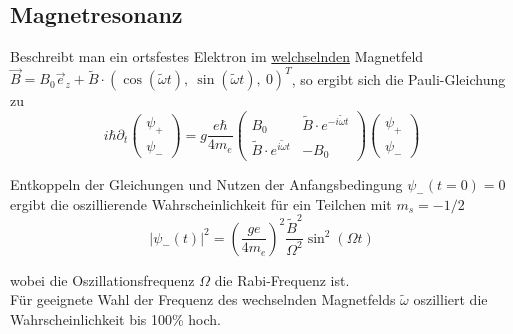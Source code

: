 \documentclass{article}
\newcommand{\lr}[1]{\left(#1\right)}
\begin{document}
\subsection{Magnetresonanz}
Beschreibt man ein ortsfestes Elektron im \underline{welchselnden} Magnetfeld $\vec{B} = B_0\vec{e}_z + \tilde{B}\cdot (\cos(\tilde{\omega}t),\ \sin(\tilde{\omega}t) ,\ 0 )^T$, so ergibt sich die Pauli-Gleichung zu
	\begin{equation}
		i\hbar\partial_t \begin{pmatrix} \psi_+ \\ \psi_- \end{pmatrix} = g \frac{e\hbar}{4m_e} 
		\begin{pmatrix}
			B_0 & \tilde{B} \cdot e^{-i\tilde{\omega}t} \\
			\tilde{B} \cdot e^{i\tilde{\omega}t} & -B_0
		\end{pmatrix} 
		\begin{pmatrix} \psi_+ \\ \psi_- \end{pmatrix}
	\end{equation}

Entkoppeln der Gleichungen und Nutzen der Anfangsbedingung $\psi_-(t=0)=0$ ergibt die oszillierende Wahrscheinlichkeit für ein Teilchen mit $m_s=-1/2$
	\begin{equation}
		|\psi_-(t)|^2 = \lr{\frac{g e}{4 m_e}}^2 \frac{\tilde{B}^2}{\Omega^2} \sin^2(\Omega t)
	\end{equation}

wobei die Oszillationsfrequenz $\Omega$ die Rabi-Frequenz ist.\\
Für geeignete Wahl der Frequenz des wechselnden Magnetfelds $\tilde{\omega}$ oszilliert die Wahrscheinlichkeit bis 100\% hoch.
\end{document}
